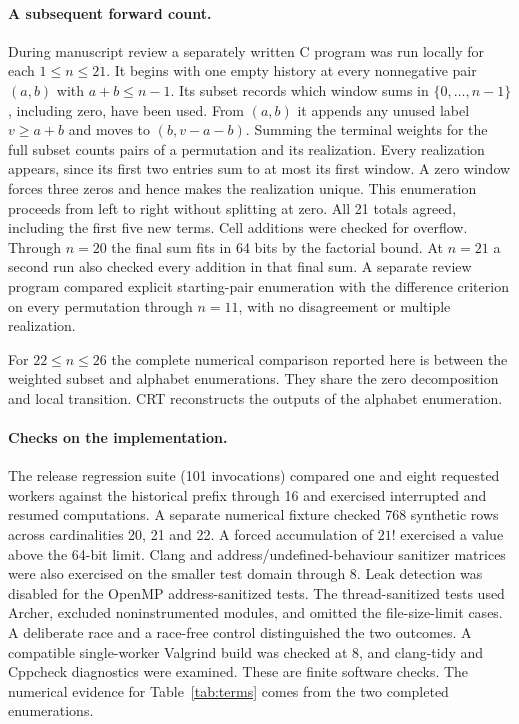 \documentclass[11pt]{article}
\begin{document}
\paragraph{A subsequent forward count.}
During manuscript review a separately written C program was run locally
for each \(1\le n\le21\). It begins with one empty history at every
nonnegative pair \((a,b)\) with \(a+b\le n-1\). Its subset records
which window sums in \(\{0,\ldots,n-1\}\), including zero, have been
used. From \((a,b)\) it appends any unused label \(v\ge a+b\) and
moves to \((b,v-a-b)\). Summing the terminal weights for the full
subset counts pairs of a permutation and its realization. Every realization
appears, since its first two entries sum to at most its first window.
A zero window forces three zeros and hence makes the realization unique.
This enumeration proceeds from left to right without splitting at zero.
All 21 totals agreed, including the first five new terms. Cell additions
were checked for overflow. Through \(n=20\) the final sum fits in 64 bits
by the factorial bound. At \(n=21\) a second run also checked every
addition in that final sum. A separate review program compared explicit
starting-pair enumeration with the difference criterion on every permutation
through \(n=11\), with no disagreement or multiple realization.

For \(22\le n\le26\) the complete numerical comparison reported here
is between the weighted subset and alphabet enumerations. They share the
zero decomposition and local transition. CRT reconstructs the outputs
of the alphabet enumeration.

\paragraph{Checks on the implementation.}
The release regression suite (101 invocations) compared one and eight requested workers against
the historical prefix through 16 and exercised interrupted and resumed
computations. A separate numerical fixture checked 768 synthetic rows
across cardinalities 20, 21 and 22. A forced accumulation of \(21!\)
exercised a value above the 64-bit limit. Clang and address/undefined-behaviour
sanitizer matrices were also exercised on the smaller test domain through 8.
Leak detection was disabled for the OpenMP address-sanitized tests.
The thread-sanitized tests used Archer, excluded noninstrumented modules,
and omitted the file-size-limit cases. A deliberate race and a race-free
control distinguished the two outcomes. A compatible single-worker
Valgrind build was checked at 8, and clang-tidy and Cppcheck diagnostics
were examined. These are finite software checks. The numerical evidence
for Table~\ref{tab:terms} comes from the two completed enumerations.
\end{document}
